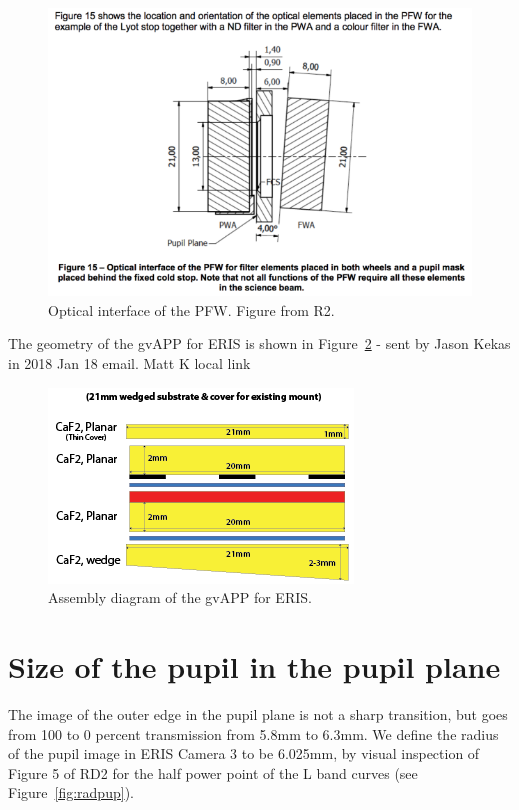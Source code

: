 \documentclass[a4paper,11pt]{article}
\begin{document}
\begin{figure}[htp]
\centering
\includegraphics[angle=0,width=\columnwidth]{optical_interface}
\caption{ \label{fig:wheels} Optical interface of the PFW. Figure from
R2.}
\end{figure}

The geometry of the gvAPP for ERIS is shown in Figure~\ref{fig:gvapp} - sent by Jason
Kekas in 2018 Jan 18 email. Matt K local link

\begin{figure}[htp]
\centering
\includegraphics[angle=0,width=0.7\columnwidth]{21mmOption_with_cover-02}
\caption{ \label{fig:gvapp} Assembly diagram of the gvAPP for ERIS.}
\end{figure}

\section{Size of the pupil in the pupil plane}

The image of the outer edge in the pupil plane is not a sharp transition, but
goes from 100 to 0 percent transmission from 5.8mm to 6.3mm. We define the
radius of the pupil image in ERIS Camera 3 to be 6.025mm, by visual inspection
of Figure 5 of RD2 for the half power point of the L band curves (see
Figure~\ref{fig:radpup}).
\end{document}
